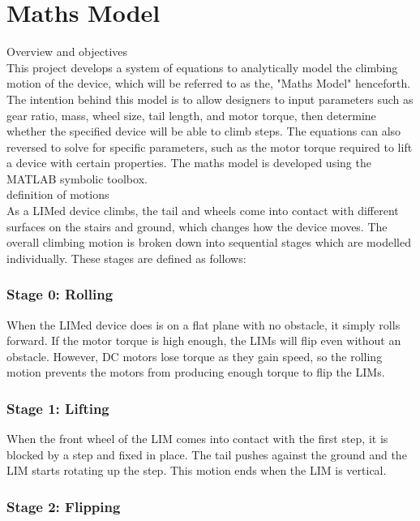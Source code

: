 \chapter{Maths Model}

Overview and objectives\\

This project develops a system of equations to analytically model the climbing motion of the device, which will be referred to as the, "Maths Model" henceforth. The intention behind this model is to allow designers to input parameters such as gear ratio, mass, wheel size, tail length, and motor torque, then determine whether the specified device will be able to climb steps. The equations can also reversed to solve for specific parameters, such as the motor torque required to lift a device with certain properties. The maths model is developed using the MATLAB symbolic toolbox.\\

definition of motions\\

As a LIMed device climbs, the tail and wheels come into contact with different surfaces on the stairs and ground, which changes how the device moves. The overall climbing motion is broken down into sequential stages which are modelled individually. These stages are defined as follows:\\
\subsection*{Stage 0: Rolling}

When the LIMed device does is on a flat plane with no obstacle, it simply rolls forward. If the motor torque is high enough, the LIMs will flip even without an obstacle. However, DC motors lose torque as they gain speed, so the rolling motion prevents the motors from producing enough torque to flip the LIMs.\\

\subsection*{Stage 1: Lifting}
When the front wheel of the LIM comes into contact with the first step, it is blocked by a step and fixed in place. The tail pushes against the ground and the LIM starts rotating up the step. This motion ends when the LIM is vertical.
\\
\subsection*{Stage 2: Flipping}

